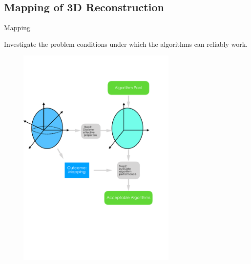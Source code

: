\documentclass[10pt]{beamer}
\begin{document}
\subsection{Mapping of 3D Reconstruction}
\begin{frame}{Mapping}

Investigate the problem conditions under which the algorithms can reliably work.

\begin{figure}
\centering
\includegraphics[width=0.7\textwidth]{images/mapping_3d_vision.pdf}
\end{figure}


\end{frame}
\end{document}
